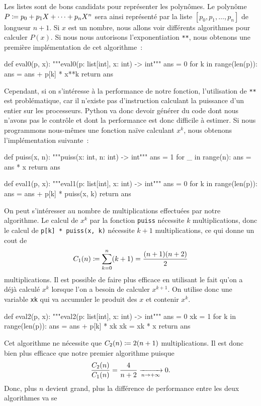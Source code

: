 \documentclass{magnolia}
\begin{document}
Les listes sont de bons candidats pour représenter les polynômes. Le polynôme 
$P\coloneqq p_0+p_1X+\cdots+p_n X^n$ sera ainsi représenté par la liste
$[p_0,p_1,\ldots,p_n]$ de longueur $n+1$. Si $x$ est un nombre, nous allons voir
différents algorithmes pour calculer $P(x)$. Si nous nous autorisons
l'exponentiation \verb!**!, nous obtenons une première
implémentation de cet algorithme~:
\begin{pythoncode}
def eval0(p, x):
    """eval0(p: list[int], x: int) -> int"""
    ans = 0
    for k in range(len(p)):
        ans = ans + p[k] * x**k
    return ans
\end{pythoncode}
Cependant, si on s'intéresse à la performance de notre fonction, l'utilisation de \verb!**!
est problématique, car il n'existe pas d'instruction calculant la puissance d'un entier sur les
processeurs. Python va donc devoir générer du code dont nous n'avons pas le contrôle et dont
la performance est donc difficile à estimer. Si nous programmons nous-mêmes une
fonction naïve calculant $x^k$, nous obtenons l'implémentation suivante~:
\begin{pythoncode}
def puiss(x, n):
    """puiss(x: int, n: int) -> int"""
    ans = 1
    for _ in range(n):
        ans = ans * x
    return ans

def eval1(p, x):
    """eval1(p: list[int], x: int) -> int"""
    ans = 0
    for k in range(len(p)):
        ans = ans + p[k] * puiss(x, k)
    return ans
\end{pythoncode}
On peut s'intéresser au nombre de multiplications effectuées par notre algorithme. Le calcul
de $x^k$ par la fonction \verb!puiss! nécessite $k$ multiplications, donc le calcul de
\verb!p[k] * puiss(x, k)! nécessite $k+1$ multiplications, ce qui donne un cout de
\[C_1(n)\coloneqq \sum_{k=0}^n (k+1)=\frac{(n+1)(n+2)}{2}\]
multiplications. Il est possible de faire plus efficace en utilisant le fait qu'on a déjà calculé
$x^k$ lorsque l'on a besoin de calculer $x^{k+1}$. On utilise donc une variable \verb!xk! qui va accumuler le
produit des $x$ et contenir $x^k$.
\begin{pythoncode}
def eval2(p, x):
    """eval2(p: list[int], x: int) -> int"""
    ans = 0
    xk = 1
    for k in range(len(p)):
        ans = ans + p[k] * xk
        xk = xk * x
    return ans
\end{pythoncode}
Cet algorithme ne nécessite que $C_2(n)\coloneqq 2(n+1)$ multiplications. Il est donc bien plus efficace
que notre premier algorithme puisque
\[\frac{C_2(n)}{C_1(n)}=\frac{4}{n+2}\xrightarrow[n\rightarrow +\infty]{}0.\]
Donc, plus $n$ devient grand, plus la différence de  performance entre les deux algorithmes va se
\end{document}
